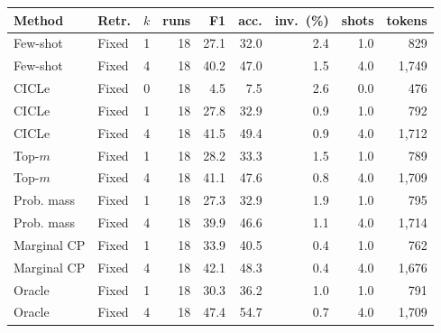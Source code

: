 \begin{tabular}{llrrrrrrr}
\toprule
Method & Retr. & $k$ & runs & F1 & acc. & inv.\ (\%) & shots & tokens \\
\midrule
Few-shot & Fixed & 1 & 18 & 27.1 & 32.0 & 2.4 & 1.0 & 829 \\
Few-shot & Fixed & 4 & 18 & 40.2 & 47.0 & 1.5 & 4.0 & 1,749 \\
CICLe & Fixed & 0 & 18 & 4.5 & 7.5 & 2.6 & 0.0 & 476 \\
CICLe & Fixed & 1 & 18 & 27.8 & 32.9 & 0.9 & 1.0 & 792 \\
CICLe & Fixed & 4 & 18 & 41.5 & 49.4 & 0.9 & 4.0 & 1,712 \\
\midrule
Top-$m$ & Fixed & 1 & 18 & 28.2 & 33.3 & 1.5 & 1.0 & 789 \\
Top-$m$ & Fixed & 4 & 18 & 41.1 & 47.6 & 0.8 & 4.0 & 1,709 \\
Prob. mass & Fixed & 1 & 18 & 27.3 & 32.9 & 1.9 & 1.0 & 795 \\
Prob. mass & Fixed & 4 & 18 & 39.9 & 46.6 & 1.1 & 4.0 & 1,714 \\
Marginal CP & Fixed & 1 & 18 & 33.9 & 40.5 & 0.4 & 1.0 & 762 \\
Marginal CP & Fixed & 4 & 18 & 42.1 & 48.3 & 0.4 & 4.0 & 1,676 \\
Oracle & Fixed & 1 & 18 & 30.3 & 36.2 & 1.0 & 1.0 & 791 \\
Oracle & Fixed & 4 & 18 & 47.4 & 54.7 & 0.7 & 4.0 & 1,709 \\
\bottomrule
\end{tabular}
